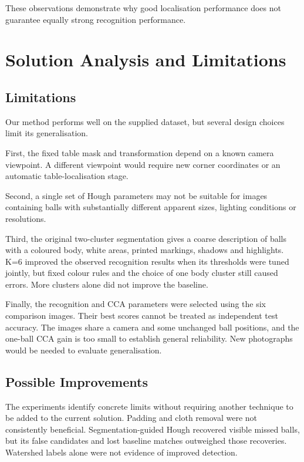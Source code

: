 \documentclass[10pt,a4paper]{article}
\begin{document}
These observations demonstrate why good localisation performance does not 
guarantee equally strong recognition performance.

\section{Solution Analysis and Limitations}
\subsection{Limitations}

Our method performs well on the supplied dataset, but several design choices 
limit its generalisation.

First, the fixed table mask and transformation depend on a known camera 
viewpoint. A different viewpoint would require new corner coordinates or an 
automatic table-localisation stage.

Second, a single set of Hough parameters may not be suitable for images 
containing balls with substantially different apparent sizes, lighting 
conditions or resolutions.

Third, the original two-cluster segmentation gives a coarse description of
balls with a coloured body, white areas, printed markings, shadows and
highlights. K=6 improved the observed recognition results when its thresholds
were tuned jointly, but fixed colour rules and the choice of one body cluster
still caused errors. More clusters alone did not improve the baseline.

Finally, the recognition and CCA parameters were selected using the six
comparison images. Their best scores cannot be treated as independent test
accuracy. The images share a camera and some unchanged ball positions, and
the one-ball CCA gain is too small to establish general reliability. New
photographs would be needed to evaluate generalisation.

\subsection{Possible Improvements}

The experiments identify concrete limits without requiring another technique
to be added to the current solution. Padding and cloth removal were not
consistently beneficial. Segmentation-guided Hough recovered visible missed
balls, but its false candidates and lost baseline matches outweighed those
recoveries. Watershed labels alone were not evidence of improved detection.
\end{document}
